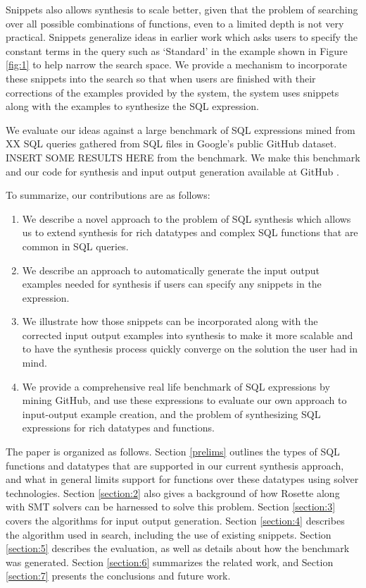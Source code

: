 Snippets also allows synthesis to scale better, given that the problem of searching over all possible combinations of functions, even to a limited depth is not very practical.  Snippets generalize ideas in earlier work \cite{BodikPLDI} which asks users to specify the constant terms in the query such as `Standard' in the example shown in Figure \ref{fig:1} to help narrow the search space.  We provide a mechanism to incorporate these snippets into the search so that when users are finished with their corrections of the examples provided by the system, the system uses snippets along with the examples to synthesize the SQL expression.

We evaluate our ideas against a large benchmark of SQL expressions mined from XX SQL queries gathered from SQL files in Google's public GitHub \cite{GitHub_repo} dataset.  INSERT SOME RESULTS HERE from the benchmark.  We make this benchmark and our code for synthesis and input output generation available at GitHub \cite{Quetzal}.

To summarize, our contributions are as follows:
\begin{enumerate}
\item We describe a novel approach to the problem of SQL synthesis which allows us to extend synthesis for rich datatypes and complex SQL functions that are common in SQL queries.
\item We describe an approach to automatically generate the input output examples needed for synthesis if users can specify any snippets in the expression.  
\item We illustrate how those snippets can be incorporated along with the corrected input output examples into synthesis to make it more scalable and to have the synthesis process quickly converge on the solution the user had in mind.
\item We provide a comprehensive real life benchmark of SQL expressions by mining GitHub, and use these expressions to evaluate our own approach to input-output example creation, and the problem of synthesizing SQL expressions for rich datatypes and functions.
\end{enumerate}

The paper is organized as follows.  Section \ref{prelims} outlines the types of SQL functions and datatypes that are supported in our current synthesis approach, and what in general limits support for functions over these datatypes using solver technologies.  Section \ref{section:2} also gives a background of how Rosette along with SMT solvers can be harnessed to solve this problem.  Section \ref{section:3} covers the algorithms for input output generation.  Section \ref{section:4} describes the algorithm used in search, including the use of existing snippets.  Section \ref{section:5} describes the evaluation, as well as details about how the benchmark was generated.  Section \ref{section:6} summarizes the related work, and Section \ref{section:7} presents the conclusions and future work.

